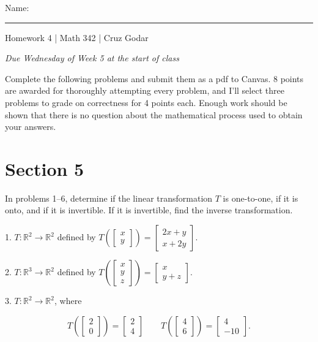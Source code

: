 \documentclass{article}
\begin{document}
\Large Name: \rule{2in}{0.15mm} \hfill Homework 4 | Math 342 | Cruz Godar \vspace{4pt} \normalsize

\textit{Due Wednesday of Week 5 at the start of class}

Complete the following problems and submit them as a pdf to Canvas. 8 points are awarded for thoroughly attempting every problem, and I'll select three problems to grade on correctness for 4 points each. Enough work should be shown that there is no question about the mathematical process used to obtain your answers.

\section{Section 5}

In problems 1--6, determine if the linear transformation $T$ is one-to-one, if it is onto, and if it is invertible. If it is invertible, find the inverse transformation.

1. $T: \mathbb{R}^2 \to \mathbb{R}^2$ defined by $T\left(\left[\begin{array}{c} x \\ y \end{array}\right]\right) = \left[\begin{array}{c} 2x + y \\ x + 2y\end{array}\right]$.

2. $T: \mathbb{R}^3 \to \mathbb{R}^2$ defined by $T\left(\left[\begin{array}{c} x \\ y \\ z \end{array}\right]\right) = \left[\begin{array}{c} x \\ y + z \end{array}\right]$.

3. $T: \mathbb{R}^2 \to \mathbb{R}^2$, where

$$
	T\left(\left[\begin{array}{c} 2 \\ 0 \end{array}\right]\right) = \left[\begin{array}{c} 2 \\ 4 \end{array}\right] \qquad T\left(\left[\begin{array}{c} 4 \\ 6 \end{array}\right]\right) = \left[\begin{array}{c} 4 \\ -10 \end{array}\right].
$$
\end{document}
